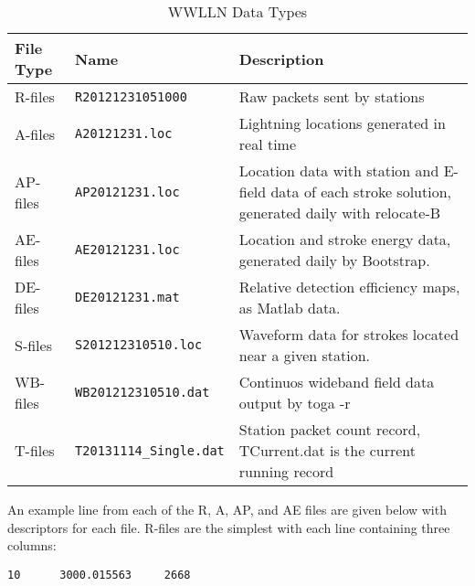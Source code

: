 \begin{table}[h!]
\begin{center}
\caption{WWLLN Data Types}
\begin{tabular}{|p{.75in}|p{1.5in}|p{3.5in}|}

\hline
{\bf File Type} & {\bf Name} &	{\bf Description} \\

\hline
\rule{0pt}{3ex}
R-files	& \texttt{R20121231051000}	&	Raw packets sent by stations\\ 

\hline
\rule{0pt}{3ex}
A-files	& \texttt{A20121231.loc}	&	Lightning locations generated in real time\\ 

\hline
\rule{0pt}{3ex}
AP-files	& \texttt{AP20121231.loc}	&	Location data with station and E-field data of each stroke solution, generated daily with relocate-B\\ 

\hline
\rule{0pt}{3ex}
AE-files	& \texttt{AE20121231.loc}	&	Location and stroke energy data, generated daily by Bootstrap.\\ 

\hline
\rule{0pt}{3ex}
DE-files	& \texttt{DE20121231.mat}	&	Relative detection efficiency maps, as Matlab data.\\ 

\hline
\rule{0pt}{3ex}
S-files	& \texttt{S201212310510.loc}	&	Waveform data for strokes located near a given station.\\ 

\hline
\rule{0pt}{3ex}
WB-files	& \texttt{WB201212310510.dat}	&	Continuos wideband field data output by toga -r\\ 

\hline
\rule{0pt}{3ex}
T-files	& \texttt{T20131114\_Single.dat}	&	Station packet count record, TCurrent.dat is the current running record\\ 

\hline
\end{tabular}
\end{center}
\label{code:table:fileType}
\end{table}
 
An example line from each of the R, A, AP, and AE files are given below with descriptors for each file.
R-files are the simplest with each line containing three columns:

\begin{verbatim}
10      3000.015563     2668
\end{verbatim}

